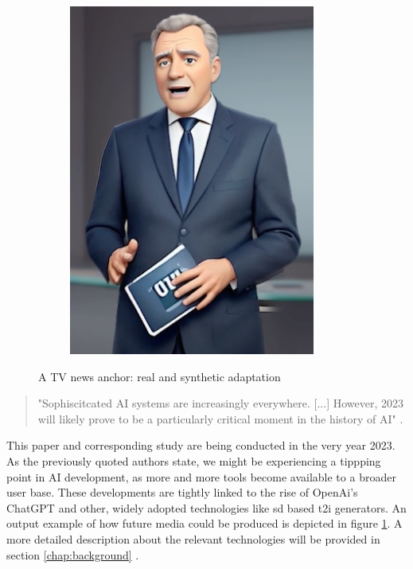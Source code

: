 \documentclass[
  a4paper,  %
  twoside,  %
  bibliography=totoc,
  headsepline,
  cleardoublepage=empty,
  parskip=half,
  draft=false
]{scrbook}
\begin{document}
\begin{figure}[h]
\begin{subfigure}[b]{0.4\textwidth}
    \includegraphics[width=\textwidth]{./graphics/images/scheider-sd.png}
  \end{subfigure}
  \caption{A TV news anchor: real and synthetic adaptation}
  \label{fig:scheider-real-sd}
\end{figure}
\begin{quotation}
"Sophiscitcated AI systems are increasingly everywhere. [...] However, 2023 will likely prove to be a particularly critical moment in the history of AI" \citet{arguedasAutomatingDemocracyGenerative2023}.
\end{quotation}
This paper and corresponding study are being conducted in the very year 2023. As the previously quoted authors state, we might be experiencing a tippping point in AI development, as more and more tools become available to a broader user base. These developments are tightly linked to the rise of OpenAi's ChatGPT and other, widely adopted technologies like \gls{sd} based \gls{t2i} generators. An output example of how future media could  be produced is depicted in figure \ref{fig:scheider-real-sd}. A more detailed description about the relevant technologies will be provided in section \ref{chap:background} . \\
\end{document}
